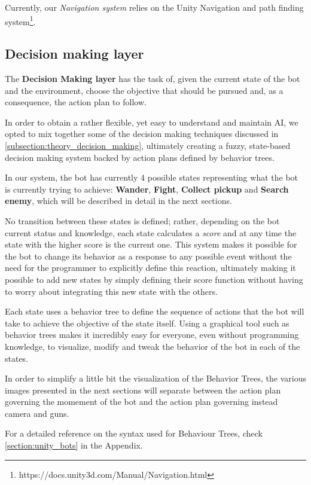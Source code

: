 Currently, our \textit{Navigation system} relies on the Unity Navigation and path finding system\footnote{https://docs.unity3d.com/Manual/Navigation.html}.

\subsection{Decision making layer}
The \textbf{Decision Making layer} has the task of, given the current state of the bot and the environment, choose the objective that should be pursued and, as a consequence, the action plan to follow.

In order to obtain a rather flexible, yet easy to understand and maintain AI, we opted to mix together some of the decision making techniques discussed in \ref{subsection:theory_decision_making}, ultimately creating a fuzzy, state-based decision making system backed by action plans defined by behavior trees.

In our system, the bot has currently 4 possible states representing what the bot is currently trying to achieve: \textbf{Wander}, \textbf{Fight}, \textbf{Collect pickup} and \textbf{Search enemy}, which will be described in detail in the next sections.

No transition between these states is defined; rather, depending on the bot current status and knowledge, each state calculates a \textit{score} and at any time the state with the higher score is the current one. This system makes it possible for the bot to change its behavior as a response to any possible event without the need for the programmer to explicitly define this reaction, ultimately making it possible to add new states by simply defining their score function without having to worry about integrating this new state with the others.

Each state uses a behavior tree to define the sequence of actions that the bot will take to achieve the objective of the state itself. Using a graphical tool such as behavior trees makes it incredibly easy for everyone, even without programming knowledge, to visualize, modify and tweak the behavior of the bot in each of the states.

In order to simplify a little bit the visualization of the Behavior Trees, the various images presented in the next sections will separate between the action plan governing the momement of the bot and the action plan governing instead camera and guns.

For a detailed reference on the syntax used for Behaviour Trees, check \ref{section:unity_bots} in the Appendix.

